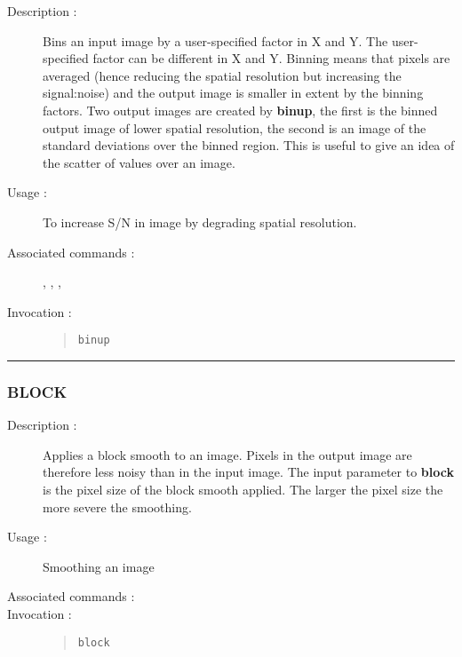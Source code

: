 \begin{description}

\item[Description :] Bins an input image by a user-specified factor in
X and Y.  The user-specified factor can be different in X and Y.
Binning means that pixels are averaged (hence reducing the spatial
resolution but increasing the signal:noise) and the output image is
smaller in extent by the binning factors.  Two output images are
created by {\bf binup}, the first is the binned output image of lower
spatial resolution, the second is an image of the standard deviations
over the binned region.  This is useful to give an idea of the scatter
of values over an image.

\item[Usage :] To increase S/N in image by degrading spatial resolution.

\item[Associated commands :] {\tt {}},
{\tt {}}, {\tt {}},
{\tt {}}

\item[Invocation :]

\begin{quote}{\tt  binup }\end{quote}

\end{description}

\hrule
\subsubsection*{\label{BLOCK}BLOCK}

\begin{description}

\item[Description :] Applies a block smooth to an image.
Pixels in the output image are therefore less noisy than in the input
image.  The input parameter to {\bf block} is the pixel size of the
block smooth applied.  The larger the pixel size the more severe the
smoothing.

\item[Usage :] Smoothing an image
\item[Associated commands :] {\tt {}}
\item[Invocation :]

\begin{quote}{\tt block }\end{quote}

\end{description}

